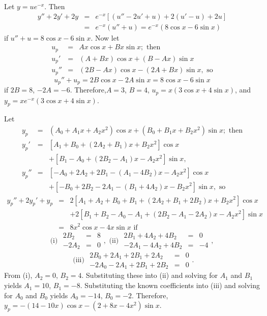 \documentclass[dvips]{book}
\renewcommand{\exer}[1]{\par\medskip\;\noindent{\color{red}\bf #1.}}
\numberwithin{example}{section}
\numberwithin{equation}{section}
\numberwithin{theorem}{section}
\numberwithin{table}{section}
\numberwithin{figure}{section}
\begin{document}
\exer{5.5.10}
Let $y=ue^{-x}$. Then
\begin{eqnarray*}
y''+2y'+2y&=&e^{-x}\left[(u''-2u'+u)+2(u'-u)+2u\right]\\
&=&e^{-x}(u''+u)= e^{-x}(8\cos x-6\sin x)
\end{eqnarray*}
 if $u''+u=8\cos x-6\sin x$.
Now let
\begin{eqnarray*}
u_p&=&Ax\cos x+Bx\sin x; \mbox{ then}\\
u_p'&=&(A+Bx)\cos x+(B-Ax)\sin x\\
u_p''&=&(2B-Ax)\cos x-(2A+Bx)\sin x, \mbox{ so}
\end{eqnarray*}
$$
u_p''+u_p=2B\cos x-2A\sin x=8\cos x-6\sin x
$$
if $2B=8$, $-2A=-6$. Therefore,$A=3$, $B=4$, $u_p=x(3\cos x+4\sin x)$,
and $y_p=xe^{-x}(3\cos x+4\sin x)$.


\exer{5.5.12}
Let
\begin{eqnarray*}
y_p&=&(A_0+A_1x+A_2x^2)\cos x +(B_0+B_1x+B_2x^2)\sin x;\mbox{ then}\\
y_p'&=&\left[A_1+B_0+(2A_2+B_1)x+B_2x^2\right]\cos x\\ &&
+\left[B_1-A_0+(2B_2-A_1)x-A_2x^2\right]\sin x, \\
y_p''&=&\left[-A_0+2A_2+2B_1-(A_1-4B_2)x-A_2x^2\right]\cos x\\ &&+
\left[-B_0+2B_2-2A_1-(B_1+4A_2)x-B_2x^2\right]\sin x,\mbox{ so}
\end{eqnarray*}
\begin{eqnarray*}
y_p''+2y_p'+y_p&=&2\left[A_1+A_2+B_0+B_1+(2A_2+B_1+2B_2)x+
B_2x^2\right]\cos x\\ && +
2\left[B_1+B_2-A_0-A_1+(2B_2-A_1-2A_2)x-A_2x^2\right]\sin x\\
&=&8x^2\cos x-4x\sin x \mbox{ if}
\end{eqnarray*}
$$
\mbox{(i) } \begin{array}{rcl} 2B_2&=&8\\-2A_2&=&0\end{array},
\mbox{ (ii) } \begin{array}{rcr} 2B_1+4A_2+4B_2&=&0
\\-2A_1-4A_2+4B_2&=&-4\end{array},
$$
$$
\mbox{ (iii) } \begin{array}{rcl}2B_0+2A_1+2B_1+2A_2&=&0
\\-2A_0-2A_1+2B_1+2B_2&=&0\end{array}.
$$
From (i), $A_2=0$, $B_2=4$. Substituting these into (ii) and solving
for $A_1$ and $B_1$ yields $A_1=10$, $B_1=-8$. Substituting the known
coefficients into (iii) and solving for $A_0$ and $B_0$ yields
$A_0=-14$, $B_0=-2$. Therefore,$y_p=-(14-10x)\cos x-(2+8x-4x^2)\sin
x$.
\end{document}
